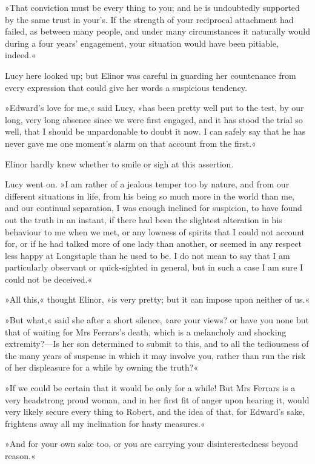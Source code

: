 »That conviction must be every thing to you; and he is undoubtedly supported by the same trust in your’s. If the strength of your reciprocal attachment had failed, as between many people, and under many circumstances it naturally would during a four years’ engagement, your situation would have been pitiable, indeed.«

Lucy here looked up; but Elinor was careful in guarding her countenance from every expression that could give her words a suspicious tendency.

»Edward’s love for me,« said Lucy, »has been pretty well put to the test, by our long, very long absence since we were first engaged, and it has stood the trial so well, that I should be unpardonable to doubt it now. I can safely say that he has never gave me one moment’s alarm on that account from the first.«

Elinor hardly knew whether to smile or sigh at this assertion.

Lucy went on. »I am rather of a jealous temper too by nature, and from our different situations in life, from his being so much more in the world than me, and our continual separation, I was enough inclined for suspicion, to have found out the truth in an instant, if there had been the slightest alteration in his behaviour to me when we met, or any lowness of spirits that I could not account for, or if he had talked more of one lady than another, or seemed in any respect less happy at Longstaple than he used to be. I do not mean to say that I am particularly observant or quick-sighted in general, but in such a case I am sure I could not be deceived.«

»All this,« thought Elinor, »is very pretty; but it can impose upon neither of us.«

»But what,« said she after a short silence, »are your views? or have you none but that of waiting for Mrs Ferrars’s death, which is a melancholy and shocking extremity?—Is her son determined to submit to this, and to all the tediousness of the many years of suspense in which it may involve you, rather than run the risk of her displeasure for a while by owning the truth?«

»If we could be certain that it would be only for a while! But Mrs Ferrars is a very headstrong proud woman, and in her first fit of anger upon hearing it, would very likely secure every thing to Robert, and the idea of that, for Edward’s sake, frightens away all my inclination for hasty measures.«

»And for your own sake too, or you are carrying your disinterestedness beyond reason.«


